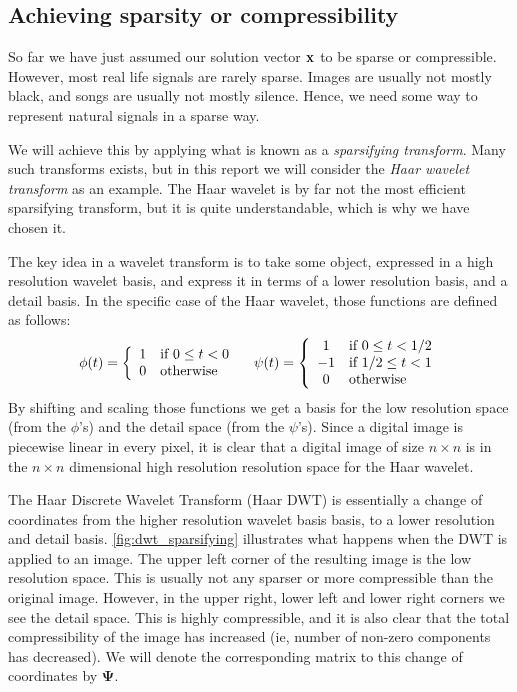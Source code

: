 \subsection{Achieving sparsity or compressibility}
So far we have just assumed our solution vector $ \mathbf{x} $ to be sparse or compressible. However, most real life signals are rarely sparse. Images are usually not mostly black, and songs are usually not mostly silence. Hence, we need some way to represent natural signals in a sparse way. 

We will achieve this by applying what is known as a \textit{sparsifying transform}. Many such transforms exists, but in this report we will consider the \textit{Haar wavelet transform} as an example. The Haar wavelet is by far not the most efficient sparsifying transform, but it is quite understandable, which is why we have chosen it. 

The key idea in a wavelet transform is to take some object, expressed in a high resolution wavelet basis, and express it in terms of a lower resolution basis, and a detail basis. In the specific case of the Haar wavelet, those functions are defined as follows:
\[
	\phi(t) = \left\{ \begin{array}{cl} 1 & \text{if } 0\leq t < 0 \\ 0 & \text{otherwise} \end{array} \right.
	\quad
	\psi(t) = \left\{ \begin{array}{cl} 1 & \text{if } 0\leq t < 1/2 \\ -1 & \text{if } 1/2 \leq t < 1 \\ 0 & \text{otherwise} \end{array} \right.
\]
By shifting and scaling those functions we get a basis for the low resolution space (from the $ \phi $'s) and the detail space (from the $ \psi $'s). Since a digital image is piecewise linear in every pixel, it is clear that a digital image of size $ n \times n $ is in the $ n \times n $ dimensional high resolution resolution space for the Haar wavelet.

The Haar Discrete Wavelet Transform (Haar DWT) is essentially a change of coordinates from the higher resolution wavelet basis basis, to a lower resolution and detail basis. \cref{fig:dwt_sparsifying} illustrates what happens when the DWT is applied to an image. The upper left corner of the resulting image is the low resolution space. This is usually not any sparser or more compressible than the original image. However, in the upper right, lower left and lower right corners we see the detail space. This is highly compressible, and it is also clear that the total compressibility of the image has increased (ie, number of non-zero components has decreased). We will denote the corresponding matrix to this change of coordinates by $ \mathbf{\Psi} $. 

